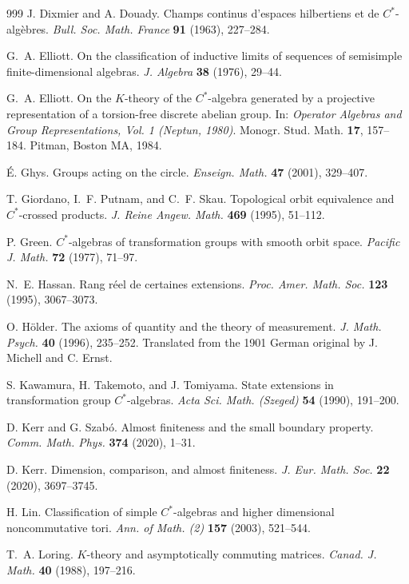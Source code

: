 \documentclass[11pt,a4paper,leqno]{amsart}
\theoremstyle{definition}
\theoremstyle{remark}
\numberwithin{equation}{section}
\theoremstyle{plain}
\begin{document}
\begin{thebibliography}{999}
J. Dixmier and A. Douady.
Champs continus d'espaces hilbertiens et de $C^*$-alg\`ebres.
{\it Bull. Soc. Math. France} {\bf 91} (1963), 227--284.

G.~A. Elliott.
On the classification of inductive limits of sequences of semisimple finite-dimensional algebras.
{\it J. Algebra} {\bf 38} (1976), 29--44.

G.~A. Elliott.
On the $K$-theory of the $C^*$-algebra generated by a projective representation of a torsion-free discrete abelian group.  
In: {\it Operator Algebras and Group Representations, Vol. 1 (Neptun, 1980)}. Monogr. Stud. Math. {\bf 17}, 157--184. Pitman, Boston MA, 1984.

É. Ghys.
Groups acting on the circle.
{\it Enseign. Math.} {\bf 47} (2001), 329--407.

T. Giordano, I.~F. Putnam, and C.~F. Skau.
Topological orbit equivalence and $C^*$-crossed products.
{\it J. Reine Angew. Math.} {\bf 469} (1995), 51--112.

P. Green.
$C^*$-algebras of transformation groups with smooth orbit space.
{\it Pacific J. Math.} {\bf 72} (1977), 71--97.

N.~E. Hassan.
Rang réel de certaines extensions.
{\it Proc. Amer. Math. Soc.} {\bf 123} (1995), 3067--3073.

O. Hölder.
The axioms of quantity and the theory of measurement.
{\it J. Math. Psych.} {\bf 40} (1996), 235--252.  
Translated from the 1901 German original by J. Michell and C. Ernst.

S. Kawamura, H. Takemoto, and J. Tomiyama.
State extensions in transformation group $C^*$-algebras.
{\it Acta Sci. Math. (Szeged)} {\bf 54} (1990), 191--200.

D. Kerr and G. Szabó.
Almost finiteness and the small boundary property.
{\it Comm. Math. Phys.} {\bf 374} (2020), 1--31.

D. Kerr.
Dimension, comparison, and almost finiteness.
{\it J. Eur. Math. Soc.} {\bf 22} (2020), 3697--3745.

H. Lin.
Classification of simple $C^*$-algebras and higher dimensional noncommutative tori.
{\it Ann. of Math. (2)} {\bf 157} (2003), 521--544.

T.~A. Loring.
$K$-theory and asymptotically commuting matrices.
{\it Canad. J. Math.} {\bf 40} (1988), 197--216. 


\end{thebibliography}
\end{document}
